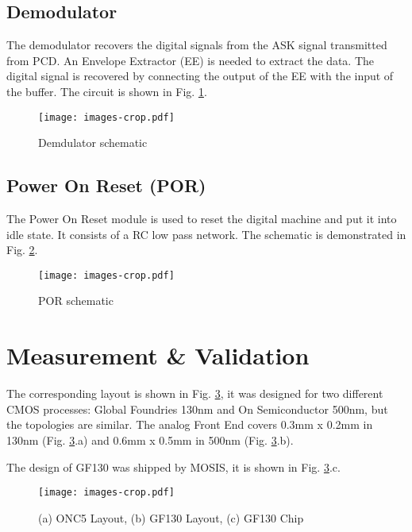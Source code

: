 \documentclass[conference]{../../resources/IEEEtran/IEEEtran}
\begin{document}
\subsection{Demodulator}

The demodulator recovers the digital signals from the ASK signal transmitted from PCD. An Envelope Extractor (EE) is needed to extract the data. The digital signal is recovered by connecting the output of the EE with the input of the buffer.  The circuit is shown in Fig. \ref{fig:demod}. 

\begin{figure}[h]
  \centering
  \texttt{[image: images-crop.pdf]}
  \caption{Demdulator schematic}
  \label{fig:demod}
\end{figure}

\subsection{Power On Reset (POR)}

The Power On Reset module is used to reset the digital machine and put it into idle state. It consists of a RC low pass network. The schematic is demonstrated in Fig. \ref{fig:por}. 

\begin{figure}[h]
  \centering
  \texttt{[image: images-crop.pdf]}
  \caption{POR schematic}
  \label{fig:por}
\end{figure}


\section{Measurement \& Validation}
\label{sec:valid}

The corresponding layout \cite{dali_man} is shown in Fig. \ref{fig:layout}, it was designed for two different CMOS processes: Global Foundries 130nm and On Semiconductor 500nm, but the topologies are similar. The analog Front End covers 0.3mm x 0.2mm in 130nm (Fig. \ref{fig:layout}.a) and 0.6mm x 0.5mm in 500nm (Fig. \ref{fig:layout}.b).

The design of GF130 was shipped by MOSIS, it is shown in Fig. \ref{fig:layout}.c. 

\begin{figure}[h]
  \centering
  \texttt{[image: images-crop.pdf]}
  \caption{(a) ONC5 Layout, (b) GF130 Layout, (c) GF130 Chip}
  \label{fig:layout}
\end{figure}
\end{document}
